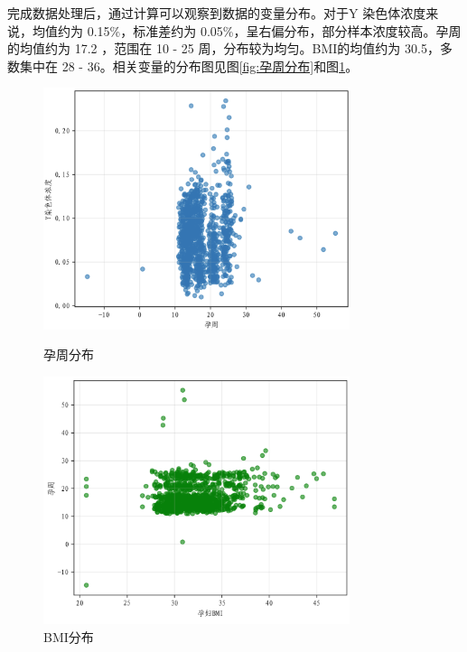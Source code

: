 \documentclass[withoutpreface,bwprint]{cumcmthesis} %
\begin{document}
完成数据处理后，通过计算可以观察到数据的变量分布。对于Y 染色体浓度来说，均值约为 0.15\%，标准差约为 0.05\%，呈右偏分布，部分样本浓度较高。孕周的均值约为 17.2 ，范围在 10 - 25 周，分布较为均匀。BMI的均值约为 30.5，多数集中在 28 - 36。相关变量的分布图见图\ref{fig:孕周分布}和图\ref{fig:BMI分布}。
\begin{figure}[H]
    \centering
    \begin{minipage}{0.49\textwidth}
        \includegraphics[width=0.8\textwidth]{../figure/q1_week_Yconc.png}
        \caption{孕周分布}
        \label{fig:孕周分布}
    \end{minipage}
    \begin{minipage}{0.49\textwidth}
        \includegraphics[width=0.8\textwidth]{../figure/q1_week_BMI.png}
        \caption{BMI分布}
        \label{fig:BMI分布}
    \end{minipage}
\end{figure}
\end{document}
